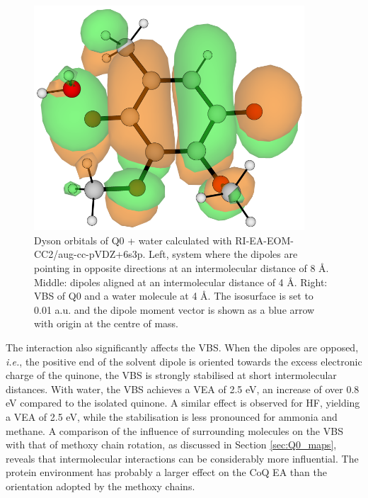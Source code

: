 \begin{figure}[h]
\begin{minipage}[b]{0.3\textwidth}
  \end{minipage}
  \hfill
  \begin{minipage}[b]{0.3\textwidth}
    \centering
    \includegraphics[width=0.9\textwidth]{chapters/results/image/Q0_H2O_VBS.png}
  \end{minipage}
  \caption[Dyson orbitals of Q0+water]{Dyson orbitals of Q0 + water calculated with RI-EA-EOM-CC2/aug-cc-pVDZ+6s3p. Left, system where the dipoles are pointing in opposite directions at an intermolecular distance of 8 \r{A}. Middle: dipoles aligned at an intermolecular distance of 4 \r{A}. Right: VBS of Q0 and a water molecule at 4 \r{A}. The isosurface is set to 0.01 a.u. and the dipole moment vector is shown as a blue arrow with origin at the centre of mass.}
  \label{fig:Q0_H2O_dyson}
\end{figure}

The interaction also significantly affects the VBS. When the dipoles are opposed, \textit{i.e.}, the positive end of the solvent dipole is oriented towards the excess electronic charge of the quinone, the VBS is strongly stabilised at short intermolecular distances. With water, the VBS achieves a VEA of 2.5 eV, an increase of over 0.8 eV compared to the isolated quinone. A similar effect is observed for HF, yielding a VEA of 2.5 eV, while the stabilisation is less pronounced for ammonia and methane. A comparison of the influence of surrounding molecules on the VBS with that of methoxy chain rotation, as discussed in Section \ref{sec:Q0_maps}, reveals that intermolecular interactions can be considerably more influential. The protein environment has probably a larger effect on the CoQ EA than the orientation adopted by the methoxy chains.\\


